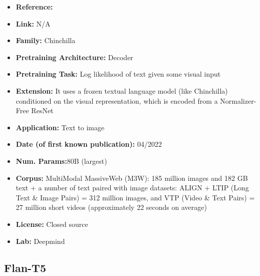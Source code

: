 \documentclass{article}
\begin{document}
            \begin{itemize}
                \item \textbf{Reference:} \href{https://arxiv.org/abs/2204.14198}{}
                \item \textbf{Link:} N/A
                \item \textbf{Family:} Chinchilla 
                \item \textbf{Pretraining Architecture:} Decoder
                \item \textbf{Pretraining Task:} Log likelihood of text given some visual input
                \item \textbf{Extension:} It uses a frozen textual language model (like Chinchilla) conditioned on the visual representation, which is encoded from a Normalizer-Free ResNet  
                \item \textbf{Application:} Text to image
                \item \textbf{Date (of first known publication):} 04/2022
                \item \textbf{Num. Params:}80B (largest)
                \item \textbf{Corpus:} MultiModal MassiveWeb (M3W): 185 million images and 182 GB text + a number of text paired with image datasets: ALIGN + LTIP (Long Text \& Image Pairs) = 312 million images, and VTP (Video \& Text Pairs) = 27 million short videos (approximately 22 seconds on average)
                \item \textbf{License:} Closed source
                \item \textbf{Lab:} Deepmind
            \end{itemize}

\subsection{Flan-T5}
\end{document}
